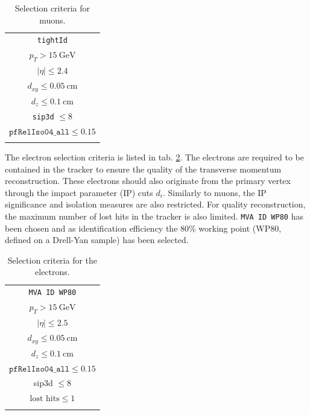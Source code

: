 \begin{table}[h!]
	\centering
	\begin{tabular}{c}
		\hline
		\texttt{tightId} \\
		$p_T > \SI{15}{\giga\electronvolt}$ \\
		$|\eta| \leq 2.4$ \\
		$d_{xy} \leq \SI{0.05}{\centi\meter}$ \\
		$d_z \leq \SI{0.1}{\centi\meter}$ \\
		\texttt{sip3d} $\leq 8$ \\
		$\texttt{pfRelIso04\_all} \leq 0.15$  \\
		\hline \\
	\end{tabular}
	\caption{Selection criteria for muons.}
	\label{tab:muon_selection}
\end{table}

The electron selection criteria is listed in tab. \ref{tab:electron_selection}. The electrons are required to be contained in the tracker to ensure the quality of the transverse momentum reconstruction. These electrons should also originate from the primary vertex through the impact parameter (IP) cuts $d_i$. Similarly to muons, the IP significance and isolation measures are also restricted. For quality reconstruction, the maximum number of lost hits in the tracker is also limited. \texttt{MVA ID WP80} has been chosen and as identification efficiency the 80\% working point (WP80, defined on a Drell-Yan sample) has been selected.

\begin{table}[h!]
	\centering
	\begin{tabular}{c}
		\hline
		\texttt{MVA ID WP80} \\
		$p_T > \SI{15}{\giga\electronvolt} $\\
		$|\eta| \leq 2.5$ \\
		$d_{xy} \leq \SI{0.05}{\centi\meter}$ \\
		$d_z \leq \SI{0.1}{\centi\meter}$ \\
		$\texttt{pfRelIso04\_all} \leq 0.15$  \\
		sip3d $\leq 8$ \\
		$\text{lost hits} \leq 1$ \\
		\hline \\
	\end{tabular}
	\caption{Selection criteria for the electrons.}
	\label{tab:electron_selection}
\end{table}

